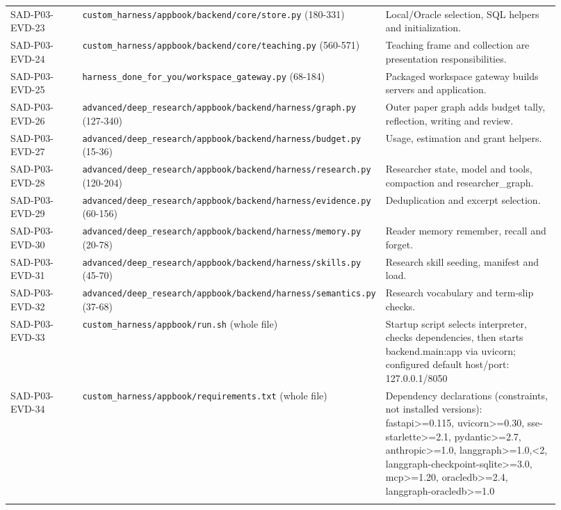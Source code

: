 \documentclass[10pt,letterpaper]{article}
\begin{document}
\begin{longtable}{@{}>{\raggedright\arraybackslash}p{0.17\linewidth}>{\raggedright\arraybackslash}p{0.34\linewidth}>{\raggedright\arraybackslash}p{0.41\linewidth}@{}}
SAD-P03-EVD-23 & \nolinkurl{custom_harness/appbook/backend/core/store.py} (180-331) & Local/Oracle selection, SQL helpers and initialization.\\\addlinespace
SAD-P03-EVD-24 & \nolinkurl{custom_harness/appbook/backend/core/teaching.py} (560-571) & Teaching frame and collection are presentation responsibilities.\\\addlinespace
SAD-P03-EVD-25 & \nolinkurl{harness_done_for_you/workspace_gateway.py} (68-184) & Packaged workspace gateway builds servers and application.\\\addlinespace
SAD-P03-EVD-26 & \nolinkurl{advanced/deep_research/appbook/backend/harness/graph.py} (127-340) & Outer paper graph adds budget tally, reflection, writing and review.\\\addlinespace
SAD-P03-EVD-27 & \nolinkurl{advanced/deep_research/appbook/backend/harness/budget.py} (15-36) & Usage, estimation and grant helpers.\\\addlinespace
SAD-P03-EVD-28 & \nolinkurl{advanced/deep_research/appbook/backend/harness/research.py} (120-204) & Researcher state, model and tools, compaction and researcher\_graph.\\\addlinespace
SAD-P03-EVD-29 & \nolinkurl{advanced/deep_research/appbook/backend/harness/evidence.py} (60-156) & Deduplication and excerpt selection.\\\addlinespace
SAD-P03-EVD-30 & \nolinkurl{advanced/deep_research/appbook/backend/harness/memory.py} (20-78) & Reader memory remember, recall and forget.\\\addlinespace
SAD-P03-EVD-31 & \nolinkurl{advanced/deep_research/appbook/backend/harness/skills.py} (45-70) & Research skill seeding, manifest and load.\\\addlinespace
SAD-P03-EVD-32 & \nolinkurl{advanced/deep_research/appbook/backend/harness/semantics.py} (37-68) & Research vocabulary and term-slip checks.\\\addlinespace
SAD-P03-EVD-33 & \nolinkurl{custom_harness/appbook/run.sh} (whole file) & Startup script selects interpreter, checks dependencies, then starts backend.main:app via uvicorn; configured default host/port: 127.0.0.1/8050\\\addlinespace
SAD-P03-EVD-34 & \nolinkurl{custom_harness/appbook/requirements.txt} (whole file) & Dependency declarations (constraints, not installed versions): fastapi>=0.115, uvicorn>=0.30, sse-starlette>=2.1, pydantic>=2.7, anthropic>=1.0, langgraph>=1.0,<2, langgraph-checkpoint-sqlite>=3.0, mcp>=1.20, oracledb>=2.4, langgraph-oracledb>=1.0\\\addlinespace
\bottomrule\end{longtable}
\end{document}
